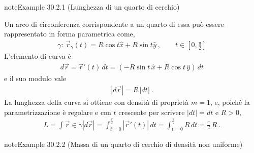 \documentclass[letterpaper,10pt,italian]{jupyterBook}
\begin{document}
\begin{sphinxadmonition}{note}{Example 30.2.1 (Lunghezza di un quarto di cerchio)}



\sphinxAtStartPar
Un arco di circonferenza corrispondente a un quarto di essa può essere rappresentato in forma parametrica come,
\begin{equation*}
\begin{split}\gamma: \, \vec{r}_{\gamma}(t) = R \cos t \hat{x}  + R \sin t \hat{y} \ , \qquad t \in \left[ 0, \frac{\pi}{2} \right]\end{split}
\end{equation*}
\sphinxAtStartPar
L’elemento di curva è
\begin{equation*}
\begin{split}d \vec{r} = \vec{r}'(t) \, dt = \left( - R \sin t \, \hat{x} + R \cos t \, \hat{y} \right) \, dt \end{split}
\end{equation*}
\sphinxAtStartPar
e il suo modulo vale
\begin{equation*}
\begin{split}|d \vec{r}| = R \, |dt| \ .\end{split}
\end{equation*}
\sphinxAtStartPar
La lunghezza della curva si ottiene con densità di proprietà \(m = 1\),  e, poiché la parametrizzazione è regolare e con \(t\) crescente per scrivere \(|d t| = d t\) e \(R > 0\),
\begin{equation*}
\begin{split}L = \int{\vec{r}\in \gamma} |d \vec{r}| =\int_{t = 0}^{\frac{\pi}{2}} \left|\vec{r}'(t)\right| \, dt =  \int_{t = 0}^{\frac{\pi}{2}} R \, dt = \frac{\pi}{2} \, R \ .\end{split}
\end{equation*}\end{sphinxadmonition}
\label{ch/vector-calculus/integrals:vector-integrals-ex-circle-quarter-mass}
\begin{sphinxadmonition}{note}{Example 30.2.2 (Massa di un quarto di cerchio di densità non uniforme)}


\end{sphinxadmonition}
\label{ch/vector-calculus/integrals:vector-integrals-ex-helix-length}
\end{document}
